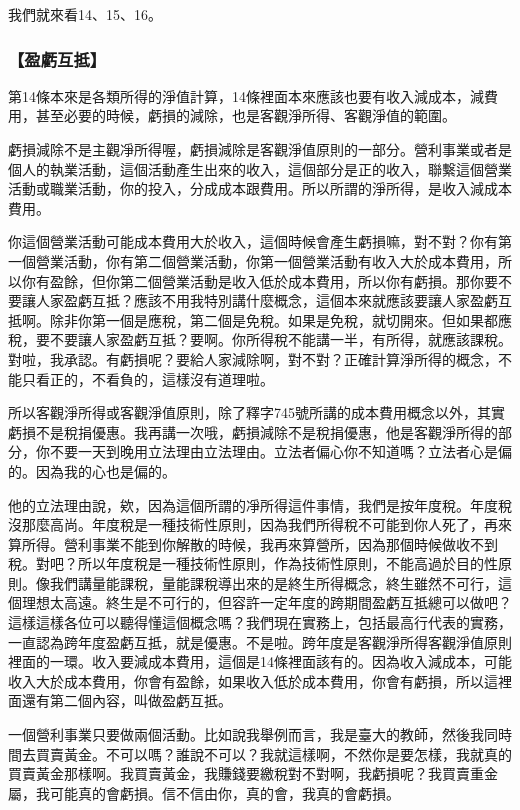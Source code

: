 \documentclass[oneside,sub3section]{ctexbook}
\begin{document}
我們就來看14、15、16。

\hypertarget{ux76c8ux8667ux4e92ux62b5}{%
\subsubsection{【盈虧互抵】}\label{ux76c8ux8667ux4e92ux62b5}}

第14條本來是各類所得的淨值計算，14條裡面本來應該也要有收入減成本，減費用，甚至必要的時候，虧損的減除，也是客觀淨所得、客觀淨值的範圍。

虧損減除不是主觀凈所得喔，虧損減除是客觀淨值原則的一部分。營利事業或者是個人的執業活動，這個活動產生出來的收入，這個部分是正的收入，聯繫這個營業活動或職業活動，你的投入，分成成本跟費用。所以所謂的淨所得，是收入減成本費用。

你這個營業活動可能成本費用大於收入，這個時候會產生虧損嘛，對不對？你有第一個營業活動，你有第二個營業活動，你第一個營業活動有收入大於成本費用，所以你有盈餘，但你第二個營業活動是收入低於成本費用，所以你有虧損。那你要不要讓人家盈虧互抵？應該不用我特別講什麼概念，這個本來就應該要讓人家盈虧互抵啊。除非你第一個是應稅，第二個是免稅。如果是免稅，就切開來。但如果都應稅，要不要讓人家盈虧互抵？要啊。你所得稅不能講一半，有所得，就應該課稅。對啦，我承認。有虧損呢？要給人家減除啊，對不對？正確計算淨所得的概念，不能只看正的，不看負的，這樣沒有道理啦。

所以客觀淨所得或客觀淨值原則，除了釋字745號所講的成本費用概念以外，其實虧損不是稅捐優惠。我再講一次哦，虧損減除不是稅捐優惠，他是客觀淨所得的部分，你不要一天到晚用立法理由立法理由。立法者偏心你不知道嗎？立法者心是偏的。因為我的心也是偏的。

他的立法理由說，欸，因為這個所謂的凈所得這件事情，我們是按年度稅。年度稅沒那麼高尚。年度稅是一種技術性原則，因為我們所得稅不可能到你人死了，再來算所得。營利事業不能到你解散的時候，我再來算營所，因為那個時候做收不到稅。對吧？所以年度稅是一種技術性原則，作為技術性原則，不能高過於目的性原則。像我們講量能課稅，量能課稅導出來的是終生所得概念，終生雖然不可行，這個理想太高遠。終生是不可行的，但容許一定年度的跨期間盈虧互抵總可以做吧？這樣這樣各位可以聽得懂這個概念嗎？我們現在實務上，包括最高行代表的實務，一直認為跨年度盈虧互抵，就是優惠。不是啦。跨年度是客觀淨所得客觀淨值原則裡面的一環。收入要減成本費用，這個是14條裡面該有的。因為收入減成本，可能收入大於成本費用，你會有盈餘，如果收入低於成本費用，你會有虧損，所以這裡面還有第二個內容，叫做盈虧互抵。

一個營利事業只要做兩個活動。比如說我舉例而言，我是臺大的教師，然後我同時間去買賣黃金。不可以嗎？誰說不可以？我就這樣啊，不然你是要怎樣，我就真的買賣黃金那樣啊。我買賣黃金，我賺錢要繳稅對不對啊，我虧損呢？我買賣重金屬，我可能真的會虧損。信不信由你，真的會，我真的會虧損。
\end{document}
